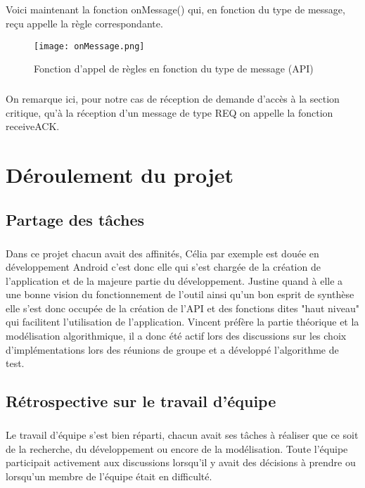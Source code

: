 \documentclass[a4paper,10pt]{report}
\begin{document}
\paragraph{}
Voici maintenant la fonction onMessage() qui, en fonction du type de message, reçu appelle la règle correspondante.

\begin{figure}[h]
    \hspace{-3cm}
    \texttt{[image: onMessage.png]}
    \caption{Fonction d'appel de règles en fonction du type de message (API)}
\end{figure}
\paragraph{}
On remarque ici, pour notre cas de réception de demande d'accès à la section critique, qu'à la réception d'un message de type REQ on appelle la fonction receiveACK.

\chapter{Déroulement du projet}
 \section{Partage des tâches}
 \paragraph{}
 Dans ce projet chacun avait des affinités, Célia par exemple est douée en développement Android c'est donc elle qui s'est chargée de la création de l'application et de la majeure partie du développement. Justine quand à elle a une bonne vision du fonctionnement de l'outil ainsi qu'un bon esprit de synthèse elle s'est donc occupée de la création de l'API et des fonctions dites "haut niveau" qui facilitent l'utilisation de l'application. Vincent préfère la partie théorique et la modélisation algorithmique, il a donc été actif lors des discussions sur les choix d'implémentations lors des réunions de groupe et a développé l'algorithme de test.
 \section{Rétrospective sur le travail d'équipe}
 \paragraph{}
 Le travail d'équipe s'est bien réparti, chacun avait ses tâches à réaliser que ce soit de la recherche, du développement ou encore de la modélisation. Toute l'équipe participait activement aux discussions lorsqu'il y avait des décisions à prendre ou lorsqu'un membre de l'équipe était en difficulté.
\end{document}
